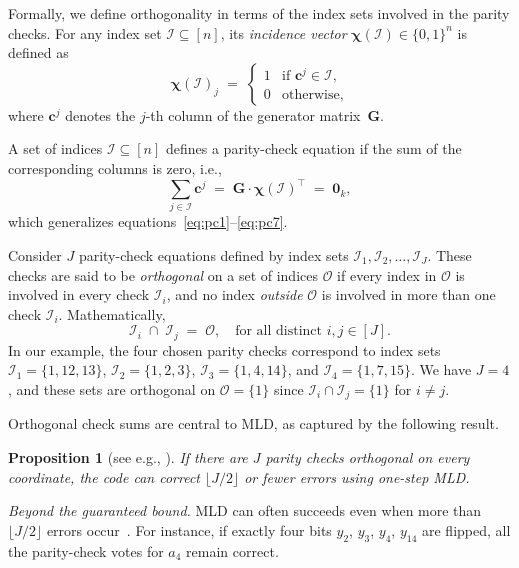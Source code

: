 \documentclass[conference,letterpaper]{IEEEtran}
\newtheorem{proposition}{Proposition}
\begin{document}
\medskip
\noindent
Formally, we define orthogonality in terms of the index sets involved in the parity checks. For any index set \( \mathcal{I} \subseteq [n] \), its \emph{incidence vector} \( \boldsymbol{\chi}(\mathcal{I}) \in \{0,1\}^n \) is defined as
\[
\boldsymbol{\chi}(\mathcal{I})_j \;=\;
\begin{cases}
1 & \text{if } \boldsymbol{c}^j \in \mathcal{I}, \\
0 & \text{otherwise},
\end{cases}
\]
where \( \boldsymbol{c}^j \) denotes the \( j \)-th column of the generator matrix~$\boldsymbol{G}$.

A set of indices \( \mathcal{I} \subseteq [n] \) defines a parity-check equation if the sum of the corresponding columns is zero, i.e.,
\[
\sum_{j \in \mathcal{I}} \boldsymbol{c}^j \;=\; \boldsymbol{G} \cdot \boldsymbol{\chi}(\mathcal{I})^\top \;=\; \boldsymbol{0}_k,
\]
which generalizes equations~\eqref{eq:pc1}–\eqref{eq:pc7}.

Consider $J$ parity-check equations defined by index sets $\mathcal{I}_1, \mathcal{I}_2, \dots, \mathcal{I}_J$. These checks are said to be \textit{orthogonal} on a set of indices $\mathcal{O}$ if every index in $\mathcal{O}$ is involved in every check $\mathcal{I}_i$, and no index \textit{outside} $\mathcal{O}$ is involved in more than one check $\mathcal{I}_i$. Mathematically,
\[
\mathcal{I}_i \;\cap\; \mathcal{I}_j \;=\; \mathcal{O}, \quad \text{for all distinct } i, j \in [J].
\]
In our example, the four chosen parity checks correspond to index sets $\mathcal{I}_1 = \{1, 12, 13\}$, $\mathcal{I}_2 = \{1, 2, 3\}$, $\mathcal{I}_3 = \{1, 4, 14\}$, and $\mathcal{I}_4 = \{1, 7, 15\}$. We have $J=4$, and these sets are orthogonal on $\mathcal{O} = \{1\}$ since $\mathcal{I}_i \cap \mathcal{I}_j = \{1\}$ for $i \neq j$.

Orthogonal check sums are central to MLD, as captured by the following result.
\begin{proposition}[see e.g., {\cite[Ch.~13]{Coding:books/MacWilliamsS77}}]
If there are $J$ parity checks orthogonal on every coordinate, the code can correct $\lfloor J/2 \rfloor$ or fewer errors using one-step MLD.
\label{prop:MJDecoding}
\end{proposition}
\textit{Beyond the guaranteed bound.} MLD can often succeeds even when more than $\lfloor J/2 \rfloor$ errors occur~\cite{Coding:books/MacWilliamsS77}. For instance, if exactly four bits $y_2$, $y_3$, $y_4$, $y_{14}$ are flipped, all the parity-check votes for $a_4$ remain correct.
\end{document}
